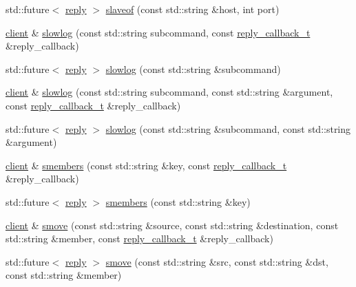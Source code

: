 \begin{DoxyCompactItemize}
\item 
std\+::future$<$ \hyperlink{classcpp__redis_1_1reply}{reply} $>$ \hyperlink{classcpp__redis_1_1client_a1731c94f72a209ffcba25767b8cab386}{slaveof} (const std\+::string \&host, int port)
\item 
\hyperlink{classcpp__redis_1_1client}{client} \& \hyperlink{classcpp__redis_1_1client_a2b9fce6f9d5c9ea1038a1c4b43b16a6d}{slowlog} (const std\+::string subcommand, const \hyperlink{classcpp__redis_1_1client_a061a1140d36d2eaeda82b09a0bb3f9f2}{reply\+\_\+callback\+\_\+t} \&reply\+\_\+callback)
\item 
std\+::future$<$ \hyperlink{classcpp__redis_1_1reply}{reply} $>$ \hyperlink{classcpp__redis_1_1client_a73f52f578ac8f266eb6e2b1f2a9cfdff}{slowlog} (const std\+::string \&subcommand)
\item 
\hyperlink{classcpp__redis_1_1client}{client} \& \hyperlink{classcpp__redis_1_1client_a62bc37eb1ef8a3b09ca58c091085c89b}{slowlog} (const std\+::string subcommand, const std\+::string \&argument, const \hyperlink{classcpp__redis_1_1client_a061a1140d36d2eaeda82b09a0bb3f9f2}{reply\+\_\+callback\+\_\+t} \&reply\+\_\+callback)
\item 
std\+::future$<$ \hyperlink{classcpp__redis_1_1reply}{reply} $>$ \hyperlink{classcpp__redis_1_1client_a4b3b0c8b11cc1e7f0bdb827eba6f7dc3}{slowlog} (const std\+::string \&subcommand, const std\+::string \&argument)
\item 
\hyperlink{classcpp__redis_1_1client}{client} \& \hyperlink{classcpp__redis_1_1client_a83458f3cff3680410d34f263cd9f30bc}{smembers} (const std\+::string \&key, const \hyperlink{classcpp__redis_1_1client_a061a1140d36d2eaeda82b09a0bb3f9f2}{reply\+\_\+callback\+\_\+t} \&reply\+\_\+callback)
\item 
std\+::future$<$ \hyperlink{classcpp__redis_1_1reply}{reply} $>$ \hyperlink{classcpp__redis_1_1client_a4cdd71bfb45eb37c593d6733ba83f09a}{smembers} (const std\+::string \&key)
\item 
\hyperlink{classcpp__redis_1_1client}{client} \& \hyperlink{classcpp__redis_1_1client_a0768130822a976cfa3e27310c7a14417}{smove} (const std\+::string \&source, const std\+::string \&destination, const std\+::string \&member, const \hyperlink{classcpp__redis_1_1client_a061a1140d36d2eaeda82b09a0bb3f9f2}{reply\+\_\+callback\+\_\+t} \&reply\+\_\+callback)
\item 
std\+::future$<$ \hyperlink{classcpp__redis_1_1reply}{reply} $>$ \hyperlink{classcpp__redis_1_1client_a4524b915c1180a4c57ffb16f660108ba}{smove} (const std\+::string \&src, const std\+::string \&dst, const std\+::string \&member)

\end{DoxyCompactItemize}
